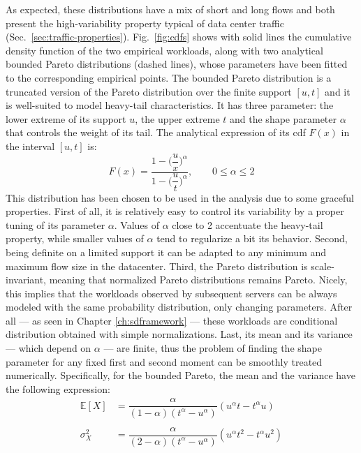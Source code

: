 As expected, these distributions have a mix of short and long flows and both present the high-variability property typical of data center traffic (Sec.~\ref{sec:traffic-properties}). Fig.~\ref{fig:cdfs} shows with solid lines the cumulative density function of the two empirical workloads, along with two analytical bounded Pareto distributions (dashed lines), whose parameters have been fitted to the corresponding empirical points. The bounded Pareto distribution is a truncated version of the Pareto distribution over the finite support $[u,t]$ and it is well-suited to model heavy-tail characteristics. It has three parameter: the lower extreme of its support $u$, the upper extreme $t$ and the shape parameter $\alpha$ that controls the weight of its tail. The analytical expression of its cdf $F(x)$ in the interval $[u,t]$ is:
\begin{equation}
	\label{eq:bpcdf}
	F(x) = \dfrac{1-\Big(\dfrac{u}{x}\Big)^{\alpha}}{1-\Big(\dfrac{u}{t}\Big)^{\alpha}}, \qquad 0 \le \alpha \le 2
\end{equation}
This distribution has been chosen to be used in the analysis due to some graceful properties. First of all, it is relatively easy to control its variability by a proper tuning of its parameter $\alpha$. Values of $\alpha$ close to 2 accentuate the heavy-tail property, while smaller values of $\alpha$ tend to regularize a bit its behavior. Second, being definite on a limited support it can be adapted to any minimum and maximum flow size in the datacenter. Third, the Pareto distribution is scale-invariant, meaning that normalized Pareto distributions remains Pareto. Nicely, this implies that the workloads observed by subsequent servers can be always modeled with the same probability distribution, only changing parameters. After all --- as seen in Chapter \ref{ch:sdframework} --- these workloads  are conditional distribution obtained with simple normalizations. Last, its mean and its variance  --- which depend on $\alpha$ --- are finite, thus the problem of finding the shape parameter for any fixed first and second moment can be smoothly treated numerically. Specifically, for the bounded Pareto, the mean and the variance have the following expression:
\begin{align*}
\mathbb{E}[X] &= \dfrac{\alpha}{(1-\alpha)(t^{\alpha}-u^{\alpha})} (u^{\alpha}t - t^{\alpha}u) \\ \\
\sigma_X^2 &= \dfrac{\alpha}{(2-\alpha)(t^{\alpha}-u^{\alpha})} (u^{\alpha}t^2 - t^{\alpha}u^2)
\end{align*}
